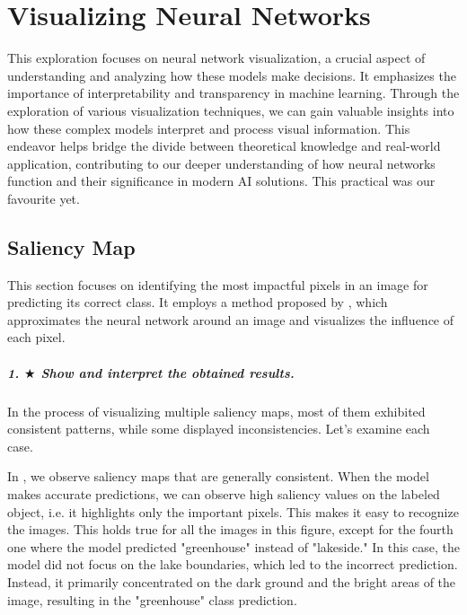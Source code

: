 \chapter{Visualizing Neural Networks}
\graphicspath{{figs/2b/}}

This exploration focuses on neural network visualization, a crucial aspect of understanding and analyzing how these models make decisions. It emphasizes the importance of interpretability and transparency in machine learning. Through the exploration of various visualization techniques, we can gain valuable insights into how these complex models interpret and process visual information. This endeavor helps bridge the divide between theoretical knowledge and real-world application, contributing to our deeper understanding of how neural networks function and their significance in modern AI solutions. This practical was our favourite yet.

\section{Saliency Map}

This section focuses on identifying the most impactful pixels in an image for predicting its correct class. It employs a method proposed by \cite{simonyan2014deep}, which approximates the neural network around an image and visualizes the influence of each pixel.

\paragraph*{1. $ \bigstar $ Show and interpret the obtained results.}
In the process of visualizing multiple saliency maps, most of them exhibited consistent patterns, while some displayed inconsistencies. Let's examine each case.


In , we observe saliency maps that are generally consistent. When the model makes accurate predictions, we can observe high saliency values on the labeled object, i.e. it highlights only the important pixels. This makes it easy to recognize the images. This holds true for all the images in this figure, except for the fourth one where the model predicted "greenhouse" instead of "lakeside." In this case, the model did not focus on the lake boundaries, which led to the incorrect prediction. Instead, it primarily concentrated on the dark ground and the bright areas of the image, resulting in the "greenhouse" class prediction. 

